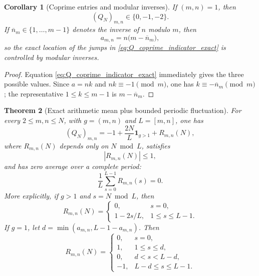 \documentclass[11pt]{amsart}
\numberwithin{equation}{section}
\theoremstyle{plain}
\newtheorem{theorem}{Theorem}[section]
\newtheorem{corollary}[theorem]{Corollary}
\theoremstyle{definition}
\theoremstyle{remark}
\begin{document}
\begin{corollary}[Coprime entries and modular inverses]
\label{cor:Q_coprime_values}
If $(m,n)=1$, then
\begin{equation}
(Q_N)_{m,n}\in\{0,-1,-2\}.
\label{eq:Q_coprime_three_values}
\end{equation}
If $\overline n_m\in\{1,\ldots,m-1\}$ denotes the inverse of $n$ modulo $m$, then
\begin{equation}
a_{m,n}=n\bigl(m-\overline n_m\bigr),
\label{eq:a_modular_inverse}
\end{equation}
so the exact location of the jumps in \eqref{eq:Q_coprime_indicator_exact} is controlled by modular inverses.
\end{corollary}

\begin{proof}
Equation \eqref{eq:Q_coprime_indicator_exact} immediately gives the three possible values.  Since $a=nk$ and $nk\equiv-1\pmod m$, one has $k\equiv-\overline n_m\pmod m$; the representative $1\le k\le m-1$ is $m-\overline n_m$.
\end{proof}

\begin{theorem}[Exact arithmetic mean plus bounded periodic fluctuation]
\label{thm:Q_periodic_decomposition}
For every $2\le m,n\le N$, with $g=(m,n)$ and $L=[m,n]$, one has
\begin{equation}
(Q_N)_{m,n}
=-1+\frac{2N}{L}\mathbf 1_{g>1}+R_{m,n}(N),
\label{eq:Q_mean_periodic_decomposition}
\end{equation}
where $R_{m,n}(N)$ depends only on $N\bmod L$, satisfies
\begin{equation}
|R_{m,n}(N)|\le1,
\label{eq:R_uniform_bound}
\end{equation}
and has zero average over a complete period:
\begin{equation}
\frac1L\sum_{s=0}^{L-1}R_{m,n}(s)=0.
\label{eq:R_zero_mean}
\end{equation}
More explicitly, if $g>1$ and $s=N\bmod L$, then
\begin{equation}
R_{m,n}(N)=
\begin{cases}
0,&s=0,\\[1mm]
1-2s/L,&1\le s\le L-1.
\end{cases}
\label{eq:R_non_coprime_explicit}
\end{equation}
If $g=1$, let $d=\min(a_{m,n},L-1-a_{m,n})$.  Then
\begin{equation}
R_{m,n}(N)=
\begin{cases}
0,&s=0,\\
1,&1\le s\le d,\\
0,&d<s<L-d,\\
-1,&L-d\le s\le L-1.
\end{cases}
\label{eq:R_coprime_explicit}
\end{equation}
\end{theorem}
\end{document}
